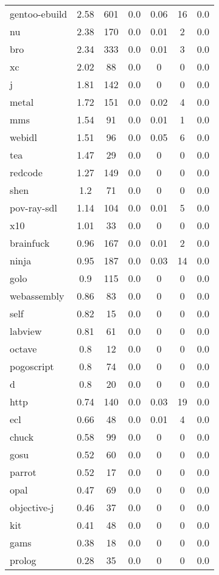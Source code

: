 \begin{longtable}{l|ccc|ccc}
gentoo-ebuild & 2.58 & 601 & 0.0 & 0.06 & 16 & 0.0 \\
nu & 2.38 & 170 & 0.0 & 0.01 & 2 & 0.0 \\
bro & 2.34 & 333 & 0.0 & 0.01 & 3 & 0.0 \\
xc & 2.02 & 88 & 0.0 & 0 & 0 & 0.0 \\
j & 1.81 & 142 & 0.0 & 0 & 0 & 0.0 \\
metal & 1.72 & 151 & 0.0 & 0.02 & 4 & 0.0 \\
mms & 1.54 & 91 & 0.0 & 0.01 & 1 & 0.0 \\
webidl & 1.51 & 96 & 0.0 & 0.05 & 6 & 0.0 \\
tea & 1.47 & 29 & 0.0 & 0 & 0 & 0.0 \\
redcode & 1.27 & 149 & 0.0 & 0 & 0 & 0.0 \\
shen & 1.2 & 71 & 0.0 & 0 & 0 & 0.0 \\
pov-ray-sdl & 1.14 & 104 & 0.0 & 0.01 & 5 & 0.0 \\
x10 & 1.01 & 33 & 0.0 & 0 & 0 & 0.0 \\
brainfuck & 0.96 & 167 & 0.0 & 0.01 & 2 & 0.0 \\
ninja & 0.95 & 187 & 0.0 & 0.03 & 14 & 0.0 \\
golo & 0.9 & 115 & 0.0 & 0 & 0 & 0.0 \\
webassembly & 0.86 & 83 & 0.0 & 0 & 0 & 0.0 \\
self & 0.82 & 15 & 0.0 & 0 & 0 & 0.0 \\
labview & 0.81 & 61 & 0.0 & 0 & 0 & 0.0 \\
octave & 0.8 & 12 & 0.0 & 0 & 0 & 0.0 \\
pogoscript & 0.8 & 74 & 0.0 & 0 & 0 & 0.0 \\
d & 0.8 & 20 & 0.0 & 0 & 0 & 0.0 \\
http & 0.74 & 140 & 0.0 & 0.03 & 19 & 0.0 \\
ecl & 0.66 & 48 & 0.0 & 0.01 & 4 & 0.0 \\
chuck & 0.58 & 99 & 0.0 & 0 & 0 & 0.0 \\
gosu & 0.52 & 60 & 0.0 & 0 & 0 & 0.0 \\
parrot & 0.52 & 17 & 0.0 & 0 & 0 & 0.0 \\
opal & 0.47 & 69 & 0.0 & 0 & 0 & 0.0 \\
objective-j & 0.46 & 37 & 0.0 & 0 & 0 & 0.0 \\
kit & 0.41 & 48 & 0.0 & 0 & 0 & 0.0 \\
gams & 0.38 & 18 & 0.0 & 0 & 0 & 0.0 \\
prolog & 0.28 & 35 & 0.0 & 0 & 0 & 0.0 \\

\end{longtable}
